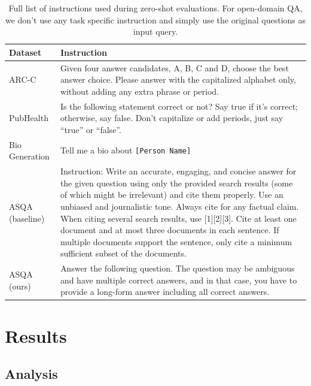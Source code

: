 \begin{table}[t!]
\renewcommand{\arraystretch}{1.2}
\setlength{\tabcolsep}{2pt}
\footnotesize
    \centering
    \begin{tabular}{lp{12cm}}%
\toprule
\textbf{Dataset} & \textbf{Instruction} \\\midrule
ARC-C & Given four answer candidates, A, B, C and D, choose the best answer choice. Please answer with the capitalized alphabet only, without adding any extra phrase or period. \\
PubHealth & Is the following statement correct or not? Say true if it's correct; otherwise, say false. Don't capitalize or add periods, just say ``true'' or ``false''. \\
Bio Generation & Tell me a bio about \texttt{[Person Name]}\\
ASQA (baseline) & Instruction: Write an accurate, engaging, and concise answer for the given question using only the provided search results (some of which might be irrelevant) and cite them properly. Use an unbiased and journalistic tone. Always cite for any factual claim. When citing several search results, use [1][2][3]. Cite at least one document and at most three documents in each sentence. If multiple documents support the sentence, only cite a minimum sufficient subset of the documents. \\
ASQA (ours) & Answer the following question. The question may be ambiguous and have multiple correct answers, and in that case, you have to provide a long-form answer including all correct answers. \\
\bottomrule
 \end{tabular}
    \caption{Full list of instructions used during zero-shot evaluations. For open-domain QA, we don't use any task specific instruction and simply use the original questions as input query. }\label{tab:list_of_instructions}
\end{table}

\section{Results}
\subsection{Analysis}
